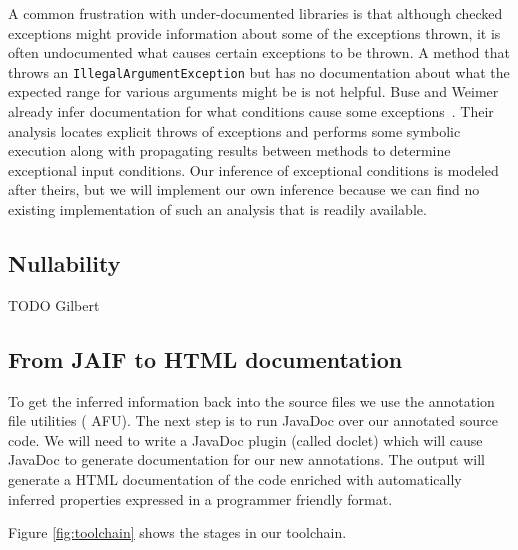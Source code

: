 A common frustration with under-documented libraries is that although checked
exceptions might provide information about some of the exceptions thrown, it is
often undocumented what causes certain exceptions to be thrown.  A method that
throws an \texttt{IllegalArgumentException} but has no documentation about what
the expected range for various arguments might be is not helpful.  Buse and
Weimer already infer documentation for what conditions cause some
exceptions~\cite{autodoc}.  Their analysis locates explicit throws of exceptions
and performs some symbolic execution along with propagating results between
methods to determine exceptional input conditions.  Our inference of exceptional
conditions is modeled after
theirs, but we will implement our own inference because we can find no existing
implementation of such an analysis that is readily available.

\subsection{Nullability}
\label{sec:Nullability}
TODO Gilbert


\subsection{From JAIF to HTML documentation}
\label{sec:jaif2html}

To get the inferred information back into the source files we use the annotation 
file utilities (\cite{AFU} AFU). The next step is to run JavaDoc over our
annotated source code. We will need to write a JavaDoc plugin (called doclet) which will
cause JavaDoc to generate documentation for our new annotations. The output will
generate a HTML documentation of the code enriched with automatically inferred
properties expressed in a programmer friendly format.

Figure \ref{fig:toolchain} shows the stages in our toolchain.
